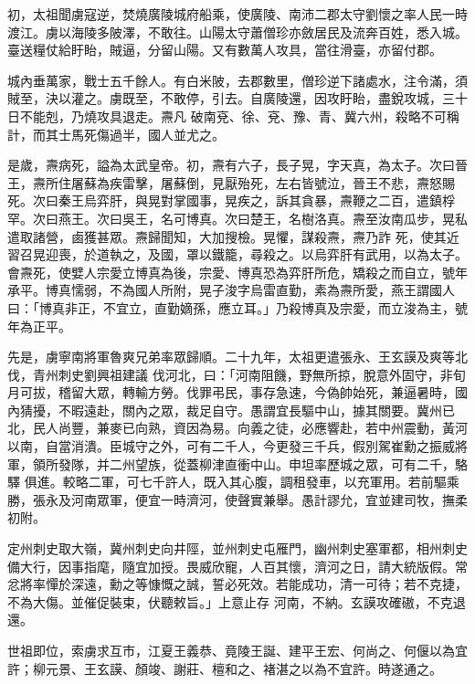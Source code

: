 \begin{pinyinscope}
 初，太祖聞虜寇逆，焚燒廣陵城府船乘，使廣陵、南沛二郡太守劉懷之率人民一時渡江。虜以海陵多陂澤，不敢往。山陽太守蕭僧珍亦斂居民及流奔百姓，悉入城。臺送糧仗給盱眙，賊逼，分留山陽。又有數萬人攻具，當往滑臺，亦留付郡。



 城內垂萬家，戰士五千餘人。有白米陂，去郡數里，僧珍逆下諸處水，注令滿，須賊至，決以灌之。虜既至，不敢停，引去。自廣陵還，因攻盱眙，盡銳攻城，三十日不能剋，乃燒攻具退走。燾凡
 破南兗、徐、兗、豫、青、冀六州，殺略不可稱計，而其士馬死傷過半，國人並尤之。



 是歲，燾病死，謚為太武皇帝。初，燾有六子，長子晃，字天真，為太子。次曰晉王，燾所住屠蘇為疾雷擊，屠蘇倒，見厭殆死，左右皆號泣，晉王不悲，燾怒賜死。次曰秦王烏弈肝，與晃對掌國事，晃疾之，訴其貪暴，燾鞭之二百，遣鎮桴罕。次曰燕王。次曰吳王，名可博真。次曰楚王，名樹洛真。燾至汝南瓜步，晃私遣取諸營，鹵獲甚眾。燾歸聞知，大加搜檢。晃懼，謀殺燾，燾乃詐
 死，使其近習召晃迎喪，於道執之，及國，罩以鐵籠，尋殺之。以烏弈肝有武用，以為太子。會燾死，使嬖人宗愛立博真為後，宗愛、博真恐為弈肝所危，矯殺之而自立，號年承平。博真懦弱，不為國人所附，晃子浚字烏雷直勤，素為燾所愛，燕王謂國人曰：「博真非正，不宜立，直勤嫡孫，應立耳。」乃殺博真及宗愛，而立浚為主，號年為正平。



 先是，虜寧南將軍魯爽兄弟率眾歸順。二十九年，太祖更遣張永、王玄謨及爽等北伐，青州刺史劉興祖建議
 伐河北，曰：「河南阻饑，野無所掠，脫意外固守，非旬月可拔，稽留大眾，轉輸方勞。伐罪弔民，事存急速，今偽帥始死，兼逼暑時，國內猜擾，不暇遠赴，關內之眾，裁足自守。愚謂宜長驅中山，據其關要。冀州已北，民人尚豐，兼麥已向熟，資因為易。向義之徒，必應響赴，若中州震動，黃河以南，自當消潰。臣城守之外，可有二千人，今更發三千兵，假別駕崔勳之振威將軍，領所發隊，并二州望族，從蓋柳津直衝中山。申坦率歷城之眾，可有二千，駱驛
 俱進。較略二軍，可七千許人，既入其心腹，調租發車，以充軍用。若前驅乘勝，張永及河南眾軍，便宜一時濟河，使聲實兼舉。愚計謬允，宜並建司牧，撫柔初附。



 定州刺史取大嶺，冀州刺史向井陘，並州刺史屯雁門，幽州刺史塞軍都，相州刺史備大行，因事指麾，隨宜加授。畏威欣寵，人百其懷，濟河之日，請大統版假。常忿將率憚於深遠，勳之等慷慨之誠，誓必死效。若能成功，清一可待；若不克捷，不為大傷。並催促裝束，伏聽敕旨。」上意止存
 河南，不納。玄謨攻確磝，不克退還。



 世祖即位，索虜求互市，江夏王義恭、竟陵王誕、建平王宏、何尚之、何偃以為宜許；柳元景、王玄謨、顏竣、謝莊、檀和之、褚湛之以為不宜許。時遂通之。




\end{pinyinscope}

